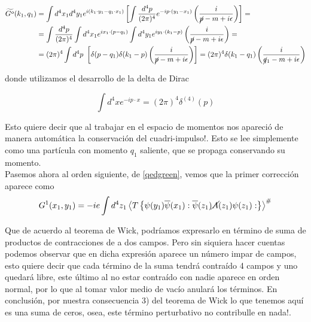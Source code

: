 \documentclass{article}
\numberwithin{equation}{section}
\begin{document}
\begin{equation}\label{g0fourier}
\begin{aligned}
\widetilde{G^{o}}(k_{1},q_{1})&= \int d^{4}x_{1}d^{4}y_{1} e^{i(k_{1}\cdot y_{1} - q_{1}\cdot x_{1})}\left[ \int\frac{d^{4}p}{(2\pi)^{4}}e^{-ip\cdot(y_{1}-x_{1})}\left(\frac{i}{\cancel{p}-m+i\epsilon}\right) \right] =\\
&=\int\frac{d^{4}p}{(2\pi)^{4}} \int d^{4}x_{1} e^{ix_1\cdot(p-q_1)} \int d^{4}y_{1} e^{iy_1\cdot(k_1-p)} \left(\frac{i}{\cancel{p}-m+i\epsilon}\right) =\\
&=(2\pi)^{4}\int d^{4}p \ \left[\delta(p-q_{1})\delta(k_1-p)\left(\frac{i}{\cancel{p}-m+i\epsilon}\right)\right]=(2\pi)^{4}\delta(k_{1}-q_{1})\left(\frac{i}{\cancel{q}_{1}-m+i\epsilon}\right)
\end{aligned}
\end{equation}

donde utilizamos el desarrollo de la delta de Dirac

\begin{equation}\label{key}
\int d^{4}x e^{-ip \cdot x} = \left(2 \pi\right)^4 \delta^{(4)}(p)
\end{equation}

Esto quiere decir que al trabajar en el espacio de momentos nos apareció de
manera automática la conservación del cuadri-impulso!. Esto se lee
simplemente como una partícula con momento $q_{1}$ saliente, que
se propaga conservando su momento.\\

Pasemos ahora al orden siguiente,
de \ref{qedgreen}, vemos que la primer corrección aparece como
\begin{equation}
G^{1}(x_{1},y_{1})=-ie\int d^{4}z_{1}\left\langle T\left\{ \psi(y_{1})\overline{\psi}(x_{1}):\overline{\psi}(z_{1})\cancel{A}(z_{1})\psi(z_{1}):\right\} \right\rangle ^{\#}
\end{equation}

Que de acuerdo al teorema de Wick, podríamos expresarlo en término
de suma de productos de contracciones de a dos campos. Pero sin siquiera
hacer cuentas podemos observar que en dicha expresión aparece un número
impar de campos, esto quiere decir que cada término de la suma tendrá
contraído 4 campos y uno quedará libre, este último al no estar contraído
con nadie aparece en orden normal, por lo que al tomar valor medio
de vacío anulará los términos. En conclusión, por nuestra consecuencia
3) del teorema de Wick lo que tenemos aquí es una suma de ceros, osea,
este término perturbativo no contribulle en nada!.
\end{document}
